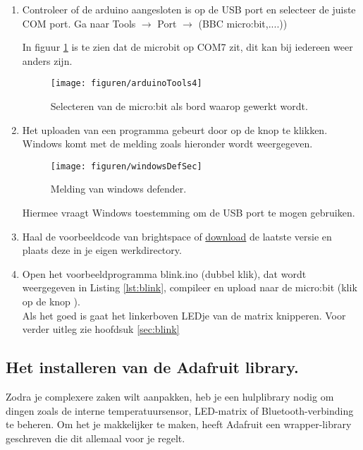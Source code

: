 \begin{enumerate}
\item Controleer of de arduino aangesloten is op de USB port en selecteer de juiste COM port. Ga naar Tools $\rightarrow$ Port $\rightarrow$ (BBC micro:bit,....))

In figuur \ref{fig:ardTool4} is te zien dat de microbit op COM7 zit, dit kan bij iedereen weer anders zijn.
\begin{figure}[H]
	\captionsetup{justification=centering}
	\texttt{[image: figuren/arduinoTools4]}
	\centering
	\caption{Selecteren van de micro:bit als bord waarop gewerkt wordt.}
	\label{fig:ardTool4}
\end{figure}

\item Het uploaden van een programma gebeurt door op de knop  te klikken. Windows komt met de melding zoals hieronder wordt weergegeven. 
   	\begin{figure}[h!]
   	\captionsetup{justification=centering}
   	\texttt{[image: figuren/windowsDefSec]}
   	\centering
   	\caption{Melding van windows defender.}
   	\label{fig:windowsDef}
   \end{figure}
Hiermee vraagt Windows toestemming om de USB port te mogen gebruiken.
\item Haal de voorbeeldcode van brightspace of \href{https://github.com/JohnVi-hhs/embsysP/tree/main/voorbeelden/blink.ino}{download} de laatste versie en plaats deze in je eigen werkdirectory.
\item \label{en:blink} Open het voorbeeldprogramma blink.ino (dubbel klik), dat wordt weergegeven in Listing \ref{lst:blink}, compileer en upload naar de micro:bit (klik op de knop ). \\
Als het goed is gaat het linkerboven LEDje van de matrix knipperen. Voor verder uitleg zie hoofdsuk \ref{sec:blink}


\end{enumerate}

\subsection{Het installeren van de Adafruit library.}\label{sec:insAdafruit}

Zodra je complexere zaken wilt aanpakken, heb je een hulplibrary nodig om dingen zoals de interne temperatuursensor, LED-matrix of Bluetooth-verbinding te beheren.
Om het je makkelijker te maken, heeft Adafruit een wrapper-library geschreven die dit allemaal voor je regelt.

